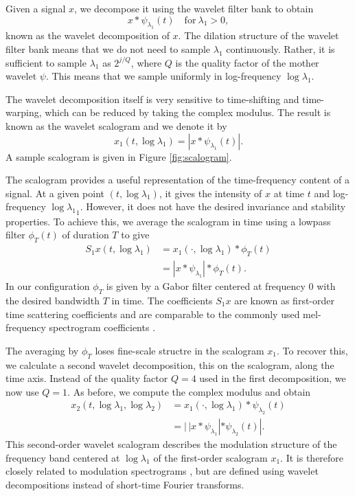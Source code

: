 \documentclass{article}
\newcommand{\lau}{{\lambda_1}}
\newcommand{\lad}{{\lambda_2}}
\begin{document}
\begin{sloppy}
Given a signal $x$, we decompose it using the wavelet filter bank to obtain
\begin{equation}
	x \ast \psi_\lau(t) \quad \mathrm{for~}\lau>0,
\end{equation}
known as the wavelet decomposition of $x$. The dilation structure of the wavelet filter bank means that we do not need to sample $\lau$ continuously. Rather, it is sufficient to sample $\lau$ as $2^{j/Q}$, where $Q$ is the quality factor of the mother wavelet $\psi$. This means that we sample uniformly in log-frequency $\log \lau$.

The wavelet decomposition itself is very sensitive to time-shifting and time-warping, which can be reduced by taking the complex modulus. The result is known as the wavelet scalogram and we denote it by
\begin{equation}
	x_1(t, \log \lau) = | x \ast \psi_\lau(t) |.
\end{equation}
A sample scalogram is given in Figure \ref{fig:scalogram}.

The scalogram provides a useful representation of the time-frequency content of a signal. At a given point $(t, \log \lau)$, it gives the intensity of $x$ at time $t$ and log-frequency $\log \lau_1$. However, it does not have the desired invariance and stability properties. To achieve this, we average the scalogram in time using a lowpass filter $\phi_T(t)$ of duration $T$ to give
\begin{align}
	\nonumber
	S_1 x(t, \log \lau) &= x_1(\cdot, \log \lau) \ast \phi_T(t) \\
	&= | x \ast \psi_\lau | \ast \phi_T(t).
\end{align}
In our configuration $\phi_T$ is given by a Gabor filter centered at frequency $0$ with the desired bandwidth $T$ in time. The coefficients $S_1 x$ are known as first-order time scattering coefficients and are comparable to the commonly used mel-frequency spectrogram coefficients \cite{davis-mermelstein}.

The averaging by $\phi_T$ loses fine-scale structre in the scalogram $x_1$. To recover this, we calculate a second wavelet decomposition, this on the scalogram, along the time axis. Instead of the quality factor $Q = 4$ used in the first decomposition, we now use $Q = 1$. As before, we compute the complex modulus and obtain
\begin{align}
	\nonumber
	x_2(t, \log \lau, \log \lad) &= x_1(\cdot, \log \lau) \ast \psi_\lad(t) \\
	&= |\,| x \ast \psi_\lau | \ast \psi_\lad (t) |.
\end{align}
This second-order wavelet scalogram describes the modulation structure of the frequency band centered at $\log \lau$ of the first-order scalogram $x_1$. It is therefore closely related to modulation spectrograms \cite{atlas}, but are defined using wavelet decompositions instead of short-time Fourier transforms.


\end{sloppy}
\end{document}
